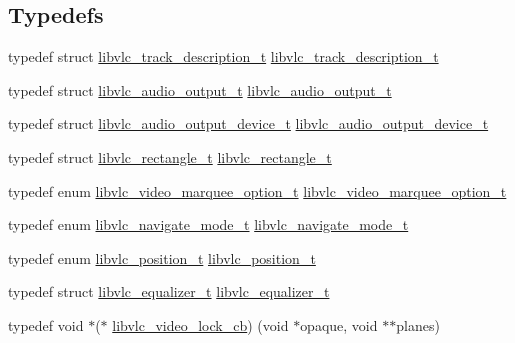 \subsection*{Typedefs}
\begin{DoxyCompactItemize}
\item 
typedef struct \hyperlink{structlibvlc__track__description__t}{libvlc\+\_\+track\+\_\+description\+\_\+t} \hyperlink{group__libvlc__media__player_gada3edbe8acd22ebc12e33993330e0494}{libvlc\+\_\+track\+\_\+description\+\_\+t}
\item 
typedef struct \hyperlink{structlibvlc__audio__output__t}{libvlc\+\_\+audio\+\_\+output\+\_\+t} \hyperlink{group__libvlc__media__player_gad740a59b9fe0043e1836f864a71cda01}{libvlc\+\_\+audio\+\_\+output\+\_\+t}
\item 
typedef struct \hyperlink{structlibvlc__audio__output__device__t}{libvlc\+\_\+audio\+\_\+output\+\_\+device\+\_\+t} \hyperlink{group__libvlc__media__player_ga88bc71eb38580ffea67174c817b51c8f}{libvlc\+\_\+audio\+\_\+output\+\_\+device\+\_\+t}
\item 
typedef struct \hyperlink{structlibvlc__rectangle__t}{libvlc\+\_\+rectangle\+\_\+t} \hyperlink{group__libvlc__media__player_gad0cdc4dd53f2b27a293bdb2f25f195f8}{libvlc\+\_\+rectangle\+\_\+t}
\item 
typedef enum \hyperlink{group__libvlc__media__player_ga412d5b45da5bda967f656cb17ecc83fd}{libvlc\+\_\+video\+\_\+marquee\+\_\+option\+\_\+t} \hyperlink{group__libvlc__media__player_ga82dd5710df44a4c244785c0150402844}{libvlc\+\_\+video\+\_\+marquee\+\_\+option\+\_\+t}
\item 
typedef enum \hyperlink{group__libvlc__media__player_ga6e6b601e219aafd4ffc6063c1dbf11b1}{libvlc\+\_\+navigate\+\_\+mode\+\_\+t} \hyperlink{group__libvlc__media__player_gae3ecf5a98d792f95033453c65adcc3a5}{libvlc\+\_\+navigate\+\_\+mode\+\_\+t}
\item 
typedef enum \hyperlink{group__libvlc__media__player_ga948997d1c6ab5fee8051417ac7dfa1c7}{libvlc\+\_\+position\+\_\+t} \hyperlink{group__libvlc__media__player_gad591cf9e00646a6e95199a1acb4b4bd2}{libvlc\+\_\+position\+\_\+t}
\item 
typedef struct \hyperlink{group__libvlc__media__player_ga1ea141a84d68d0147fc58d99bfc83ab7}{libvlc\+\_\+equalizer\+\_\+t} \hyperlink{group__libvlc__media__player_ga1ea141a84d68d0147fc58d99bfc83ab7}{libvlc\+\_\+equalizer\+\_\+t}
\item 
typedef void $\ast$($\ast$ \hyperlink{group__libvlc__media__player_ga193de3e82f6de3f9d8f5ccd8b5f2aa98}{libvlc\+\_\+video\+\_\+lock\+\_\+cb}) (void $\ast$opaque, void $\ast$$\ast$planes)
$$
\end{DoxyCompactItemize}

